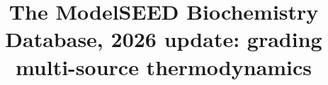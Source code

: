 \documentclass[unnumsec,webpdf,modern,large]{oup-authoring-template}
\newcommand{\TBD}[1][]{\textcolor{red}{\textbf{[TBD}\ifx\relax#1\relax\else\ #1\fi\textbf{]}}}
\newcommand{\TBD}[1][]{}
\begin{document}

\title[ModelSEED Biochemistry Database, 2026 update]{The ModelSEED Biochemistry
Database, 2026 update: grading multi-source thermodynamics}

\end{document}

